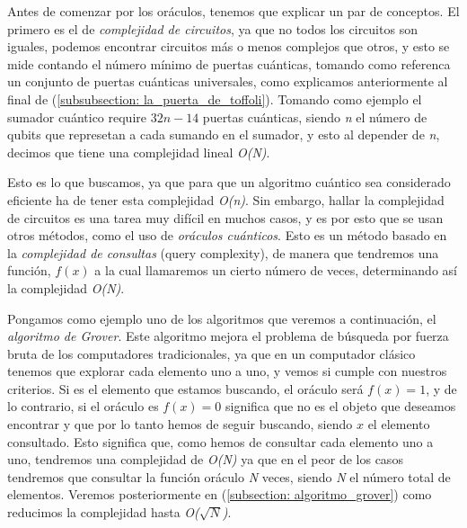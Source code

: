 \documentclass[12pt]{article}
\numberwithin{equation}{section} %
\begin{document}
    Antes de comenzar por los oráculos, tenemos que explicar un par de conceptos. El primero es el de \textit{complejidad de circuitos}, ya que no todos los circuitos son iguales, podemos encontrar circuitos más o menos complejos que otros, y esto se mide contando el número mínimo de puertas cuánticas, tomando como referenca un conjunto de puertas cuánticas universales, como explicamos anteriormente al final de (\ref{subsubsection: la_puerta_de_toffoli}). Tomando como ejemplo el sumador cuántico require \( 32n - 14 \) puertas cuánticas, siendo \textit{n} el número de qubits que represetan a cada sumando en el sumador, y esto al depender de \textit{n}, decimos que tiene una complejidad lineal \textit{O(N)}.

    \vspace{5mm}

    Esto es lo que buscamos, ya que para que un algoritmo cuántico sea considerado eficiente ha de tener esta complejidad \textit{O(n)}. Sin embargo, hallar la complejidad de circuitos es una tarea muy difícil en muchos casos, y es por esto que se usan otros métodos, como el uso de \textit{oráculos cuánticos}. Esto es un método basado en la \textit{complejidad de consultas} (query complexity), de manera que tendremos una función, \( f(x) \) a la cual llamaremos un cierto número de veces, determinando así la complejidad \textit{O(N)}. 

    \vspace{5mm}

    Pongamos como ejemplo uno de los algoritmos que veremos a continuación, el \textit{algoritmo de Grover}. Este algoritmo mejora el problema de búsqueda por fuerza bruta de los computadores tradicionales, ya que en un computador clásico tenemos que explorar cada elemento uno a uno, y vemos si cumple con nuestros criterios. Si es el elemento que estamos buscando, el oráculo será \( f(x) = 1 \), y de lo contrario, si el oráculo es \( f(x) = 0 \) significa que no es el objeto que deseamos encontrar y que por lo tanto hemos de seguir buscando, siendo \( x \) el elemento consultado. Esto significa que, como hemos de consultar cada elemento uno a uno, tendremos una complejidad de \textit{O(N)} ya que en el peor de los casos tendremos que consultar la función oráculo \textit{N} veces, siendo \textit{N} el número total de elementos. Veremos posteriormente en (\ref{subsection: algoritmo_grover}) como reducimos la complejidad hasta \textit{O($\sqrt{N}$)}.

    \vspace{5mm}
\end{document}
